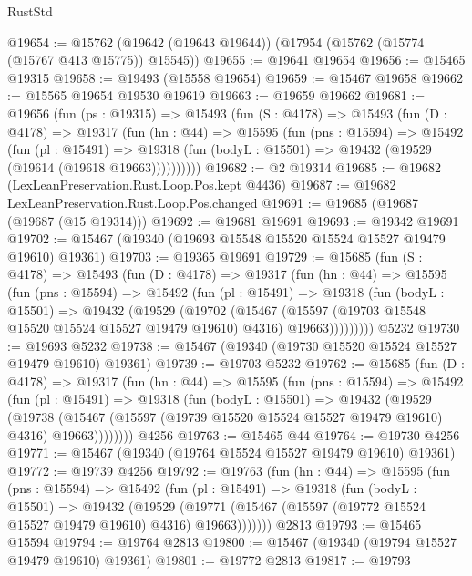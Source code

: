 \begin{lexlean}{RustStd}
\begin{coremodule}
@19654 := @15762 (@19642 (@19643 @19644)) (@17954 (@15762 (@15774 (@15767 @413 @15775)) @15545))
@19655 := @19641 @19654
@19656 := @15465 @19315
@19658 := @19493 (@15558 @19654)
@19659 := @15467 @19658
@19662 := @15565 @19654 @19530 @19619
@19663 := @19659 @19662
@19681 := @19656
    (fun (ps : @19315) =>
    @15493
      (fun (S : @4178) =>
      @15493
        (fun (D : @4178) =>
        @19317
          (fun (hn : @44) =>
          @15595
            (fun (pns : @15594) =>
            @15492
              (fun (pl : @15491) =>
              @19318 (fun (bodyL : @15501) => @19432 (@19529 (@19614 (@19618 @19663))))))))))
@19682 := @2 @19314
@19685 := @19682 (LexLeanPreservation.Rust.Loop.Pos.kept @4436)
@19687 := @19682 LexLeanPreservation.Rust.Loop.Pos.changed
@19691 := @19685 (@19687 (@19687 (@15 @19314)))
@19692 := @19681 @19691
@19693 := @19342 @19691
@19702 := @15467 (@19340 (@19693 @15548 @15520 @15524 @15527 @19479 @19610) @19361)
@19703 := @19365 @19691
@19729 := @15685
    (fun (S : @4178) =>
    @15493
      (fun (D : @4178) =>
      @19317
        (fun (hn : @44) =>
        @15595
          (fun (pns : @15594) =>
          @15492
            (fun (pl : @15491) =>
            @19318
              (fun (bodyL : @15501) =>
              @19432
                (@19529
                  (@19702
                    (@15467
                      (@15597 (@19703 @15548 @15520 @15524 @15527 @19479 @19610) @4316)
                      @19663)))))))))
    @5232
@19730 := @19693 @5232
@19738 := @15467 (@19340 (@19730 @15520 @15524 @15527 @19479 @19610) @19361)
@19739 := @19703 @5232
@19762 := @15685
    (fun (D : @4178) =>
    @19317
      (fun (hn : @44) =>
      @15595
        (fun (pns : @15594) =>
        @15492
          (fun (pl : @15491) =>
          @19318
            (fun (bodyL : @15501) =>
            @19432
              (@19529
                (@19738
                  (@15467 (@15597 (@19739 @15520 @15524 @15527 @19479 @19610) @4316) @19663))))))))
    @4256
@19763 := @15465 @44
@19764 := @19730 @4256
@19771 := @15467 (@19340 (@19764 @15524 @15527 @19479 @19610) @19361)
@19772 := @19739 @4256
@19792 := @19763
    (fun (hn : @44) =>
    @15595
      (fun (pns : @15594) =>
      @15492
        (fun (pl : @15491) =>
        @19318
          (fun (bodyL : @15501) =>
          @19432
            (@19529
              (@19771 (@15467 (@15597 (@19772 @15524 @15527 @19479 @19610) @4316) @19663)))))))
    @2813
@19793 := @15465 @15594
@19794 := @19764 @2813
@19800 := @15467 (@19340 (@19794 @15527 @19479 @19610) @19361)
@19801 := @19772 @2813
@19817 := @19793

\end{coremodule}
\end{lexlean}
